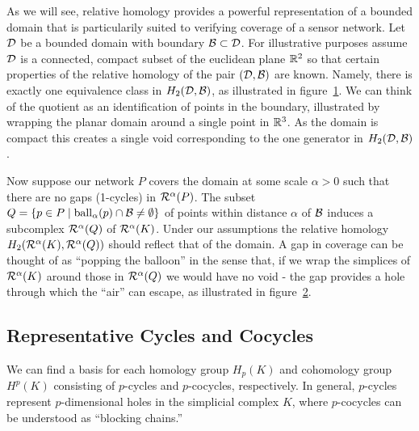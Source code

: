 As we will see, relative homology provides a powerful representation of a bounded domain that is particularily suited to verifying coverage of a sensor network.
Let ${\mathcal{D}}$ be a bounded domain with boundary ${\mathcal{B}}\subset{\mathcal{D}}$.
For illustrative purposes assume ${\mathcal{D}}$ is a connected, compact subset of the euclidean plane $\mathbb{R}^2$ so that certain properties of the relative homology of the pair $({\mathcal{D}}, {\mathcal{B}})$ are known.
Namely, there is exactly one equivalence class in $H_2({\mathcal{D}}, {\mathcal{B}})$, as illustrated in figure~\ref{fig:balloons1}.
We can think of the quotient as an identification of points in the boundary, illustrated by wrapping the planar domain around a single point in $\mathbb{R}^3$.
As the domain is compact this creates a single void corresponding to the one generator in $H_2({\mathcal{D}}, {\mathcal{B}})$.

\begin{figure}[htbp]
\centering
    \caption{}
    \label{fig:balloons1}
\end{figure}

Now suppose our network $P$ covers the domain at some scale $\alpha > 0$ such that there are no gaps (1-cycles) in $\mathcal{R}^\alpha(P)$.
The subset $Q = \{p\in P\mid \mathrm{ball}_\alpha(p)\cap{\mathcal{B}}\neq\emptyset\}$ of points within distance $\alpha$ of ${\mathcal{B}}$ induces a subcomplex $\mathcal{R}^\alpha(Q)$ of $\mathcal{R}^\alpha(K)$.
Under our assumptions the relative homology $H_2(\mathcal{R}^\alpha(K), \mathcal{R}^\alpha(Q))$ should reflect that of the domain.
A gap in coverage can be thought of as ``popping the balloon'' in the sense that, if we wrap the simplices of $\mathcal{R}^\alpha(K)$ around those in $\mathcal{R}^\alpha(Q)$ we would have no void - the gap provides a hole through which the ``air'' can escape, as illustrated in figure~\ref{fig:balloons2}.

\begin{figure}[htbp]
\centering
    \caption{}
    \label{fig:balloons2}
\end{figure}

\subsection{Representative Cycles and Cocycles}

We can find a basis for each homology group $H_p(K)$ and cohomology group $H^p(K)$ consisting of $p$-cycles and $p$-cocycles, respectively.
In general, $p$-cycles represent $p$-dimensional holes in the simplicial complex $K$, where $p$-cocycles can be understood as ``blocking chains.''


